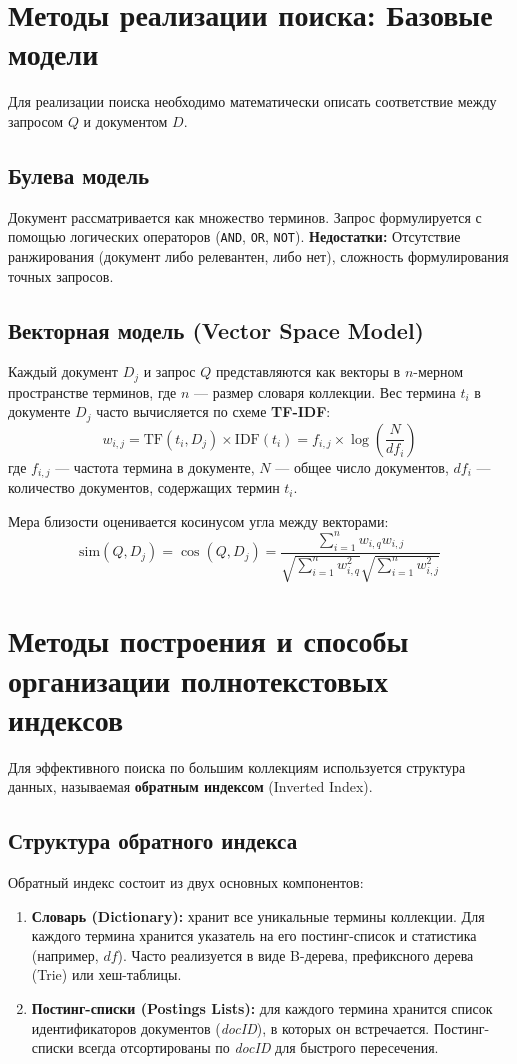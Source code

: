 \documentclass[12pt,a4paper]{article}
\begin{document}
\section{Методы реализации поиска: Базовые модели}

Для реализации поиска необходимо математически описать соответствие между запросом $Q$ и документом $D$.

\subsection{Булева модель}
Документ рассматривается как множество терминов. Запрос формулируется с помощью логических операторов (\texttt{AND}, \texttt{OR}, \texttt{NOT}).
\textbf{Недостатки:} Отсутствие ранжирования (документ либо релевантен, либо нет), сложность формулирования точных запросов.

\subsection{Векторная модель (Vector Space Model)}
Каждый документ $D_j$ и запрос $Q$ представляются как векторы в $n$-мерном пространстве терминов, где $n$ --- размер словаря коллекции.
Вес термина $t_i$ в документе $D_j$ часто вычисляется по схеме \textbf{TF-IDF}:
$$w_{i,j} = \text{TF}(t_i, D_j) \times \text{IDF}(t_i) = f_{i,j} \times \log\left(\frac{N}{df_i}\right)$$
где $f_{i,j}$ --- частота термина в документе, $N$ --- общее число документов, $df_i$ --- количество документов, содержащих термин $t_i$.

Мера близости оценивается косинусом угла между векторами:
$$\text{sim}(Q, D_j) = \cos(Q, D_j) = \frac{\sum_{i=1}^{n} w_{i,q} w_{i,j}}{\sqrt{\sum_{i=1}^{n} w_{i,q}^2} \sqrt{\sum_{i=1}^{n} w_{i,j}^2}}$$

\section{Методы построения и способы организации полнотекстовых индексов}

Для эффективного поиска по большим коллекциям используется структура данных, называемая \textbf{обратным индексом} (Inverted Index).

\subsection{Структура обратного индекса}
Обратный индекс состоит из двух основных компонентов:
\begin{enumerate}
    \item \textbf{Словарь (Dictionary):} хранит все уникальные термины коллекции. Для каждого термина хранится указатель на его постинг-список и статистика (например, $df$). Часто реализуется в виде B-дерева, префиксного дерева (Trie) или хеш-таблицы.
    \item \textbf{Постинг-списки (Postings Lists):} для каждого термина хранится список идентификаторов документов (\textit{docID}), в которых он встречается. Постинг-списки всегда отсортированы по \textit{docID} для быстрого пересечения.
\end{enumerate}
\end{document}
